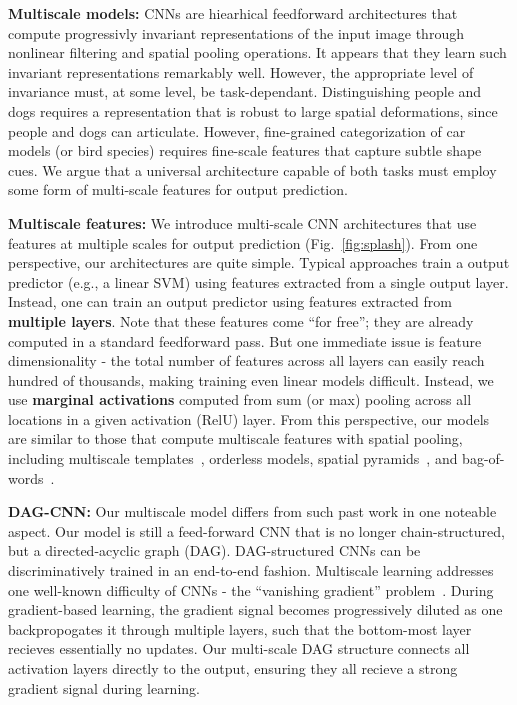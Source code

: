 \documentclass[10pt,twocolumn,letterpaper]{article}
\begin{document}
{\bf Multiscale models:}  CNNs are 
hiearhical feedforward architectures that compute progressivly invariant representations of the input image through nonlinear filtering and spatial pooling operations. It appears that they learn such invariant representations remarkably well. However, the appropriate level of invariance must, at some level, be task-dependant. Distinguishing people and dogs requires a representation that is robust to large spatial deformations, since people and dogs can articulate. However, fine-grained categorization of car models (or bird species) requires fine-scale features that capture subtle shape cues. We argue that a universal architecture capable of both tasks must employ some form of multi-scale features for output prediction.

{\bf Multiscale features:} We introduce multi-scale CNN architectures that use features at multiple scales for output prediction (Fig.~\ref{fig:splash}). From one perspective, our architectures are quite simple. Typical approaches train a output predictor (e.g., a linear SVM) using features extracted from a single output layer. Instead, one can train an output predictor using features extracted from {\bf multiple layers}. Note that these features come ``for free''; they are already computed in a standard feedforward pass. But one immediate issue is feature dimensionality - the total number of features across all layers can easily reach hundred of thousands, making training even linear models difficult. Instead, we use {\bf marginal activations} computed from sum (or max) pooling across all locations in a given activation (RelU) layer. From this perspective, our models are similar to those that compute multiscale features with spatial pooling, including multiscale templates~\cite{felzenszwalb2008discriminatively}, orderless models\cite{Gong14}, spatial pyramids~\cite{spatial_pyramid}, and bag-of-words~\cite{sivic2003video}.

{\bf DAG-CNN:} Our multiscale model differs from such past work in one noteable aspect. Our model is still a feed-forward CNN that is no longer chain-structured, but a directed-acyclic graph (DAG). DAG-structured CNNs can be discriminatively trained in an end-to-end fashion. Multiscale learning addresses one well-known difficulty of CNNs - the ``vanishing gradient'' problem~\cite{bengio1994learning}. During gradient-based learning, the gradient signal becomes progressively diluted as one backpropogates it through multiple layers, such that the bottom-most layer recieves essentially no updates. Our multi-scale DAG structure connects all activation layers directly to the output, ensuring they all recieve a strong gradient signal during learning. 
\end{document}
